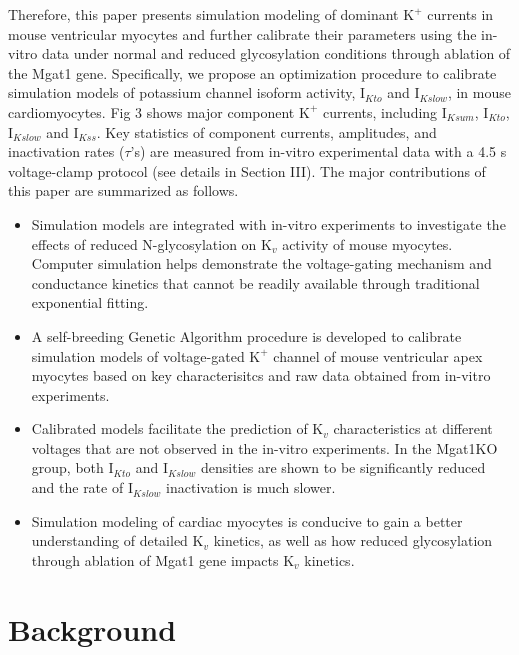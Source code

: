 \documentclass[10pt,letterpaper]{article}
\begin{document}
Therefore, this paper presents simulation modeling of dominant $\text{K}^{+}$ currents in mouse ventricular myocytes and further calibrate their parameters using the in-vitro data under normal and reduced glycosylation conditions through ablation of the Mgat1 gene. Specifically, we propose an optimization procedure to calibrate simulation models of potassium channel isoform activity, $\text{I}_{Kto}$ and $\text{I}_{Kslow}$, in mouse cardiomyocytes.  Fig 3 shows  major component $\text{K}^{+}$ currents, including $\text{I}_{Ksum}$, $\text{I}_{Kto}$, $\text{I}_{Kslow}$ and $\text{I}_{Kss}$. Key statistics of component currents, amplitudes, and inactivation rates ($\tau$'s) are measured from in-vitro experimental data with a 4.5 s voltage-clamp protocol (see details in Section III). The major contributions of this paper are summarized as follows.
\begin{itemize}
    \item Simulation models are integrated with in-vitro experiments to investigate the effects of reduced N-glycosylation on $\text{K}_{v}$ activity of mouse myocytes. Computer simulation helps demonstrate the voltage-gating mechanism and conductance kinetics that cannot be readily available through traditional exponential fitting. 
    \item A self-breeding Genetic Algorithm procedure is developed to calibrate simulation models of voltage-gated $\text{K}^{+}$ channel of mouse ventricular apex myocytes based on key characterisitcs and raw data obtained from in-vitro experiments.
    \item Calibrated models facilitate the prediction of $\text{K}_{v}$ characteristics at different voltages that are not observed in the in-vitro experiments. In the Mgat1KO group, both $\text{I}_{Kto}$ and $\text{I}_{Kslow}$ densities are shown to be significantly reduced and the rate of $\text{I}_{Kslow}$ inactivation is much slower.
    \item Simulation modeling of cardiac myocytes is conducive to gain a better understanding of detailed $\text{K}_{v}$ kinetics, as well as how reduced glycosylation through ablation of Mgat1 gene impacts $\text{K}_{v}$ kinetics.
\end{itemize}

\section*{Background}
\end{document}
